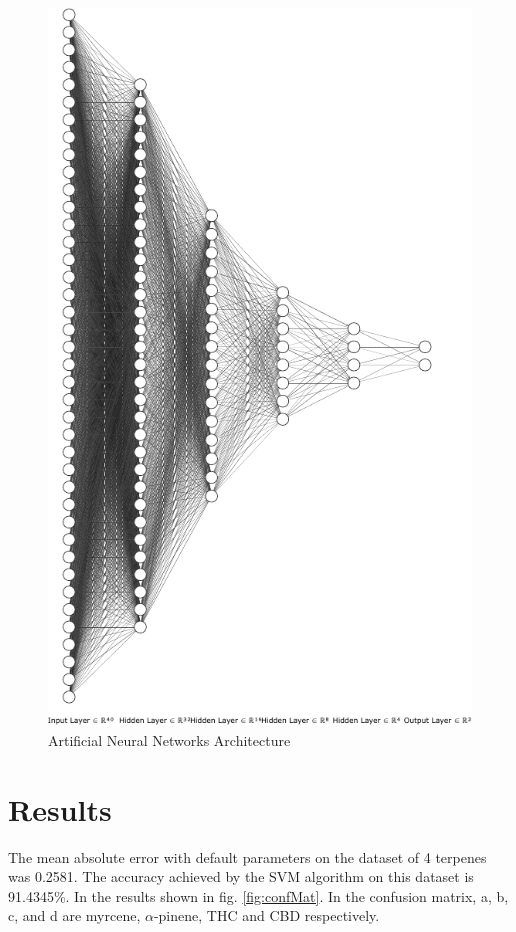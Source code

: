 \documentclass[12pt, a4paper]{article}
\begin{document}
\begin{figure}[!ht]
\centering
    \begin{center}
        \includegraphics[width = 11.7 cm]{NN.pdf}
    \end{center}
    \caption{Artificial Neural Networks Architecture}
    \label{fig:Architecture}
\end{figure}

\section{Results}
The mean absolute error with default parameters on the dataset of 4 terpenes was 0.2581. The accuracy achieved by the SVM algorithm \cite{Cortes1995} on this dataset is 91.4345\%. In the results shown in fig. \ref{fig:confMat}.
In the confusion matrix, a, b, c, and d are myrcene, $\alpha$-pinene, THC and CBD respectively.
\end{document}
